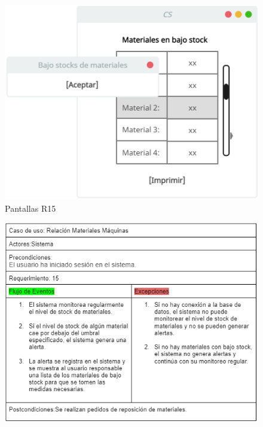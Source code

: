 \documentclass{article}
\begin{document}
    \begin{figure}
        \begin{center}
            \includegraphics[width=0.8\linewidth]{imagenes/pan_alerta.png}
            \caption{Pantallas R15}  
        \end{center}
    \end{figure}
    
    \begin{figure}
        \begin{center}
            \includegraphics[width=1\linewidth]{imagenes/diagram_usecase_alert_bajostocks.png}  
        \end{center}  
    \end{figure}
    
\clearpage
\end{document}
